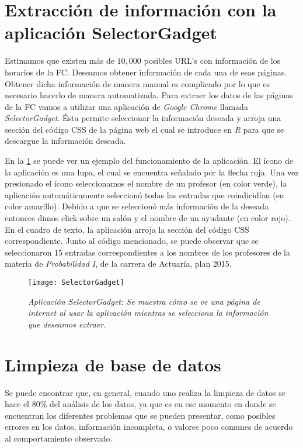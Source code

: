 \section{Extracción de información con la aplicación SelectorGadget}

Estimamos que existen más de $10,000$ posibles URL's con información de los horarios de la FC. Deseamos obtener información de cada una de esas páginas. Obtener dicha información de manera manual es complicado por lo que es necesario hacerlo de manera automatizada. Para extraer los datos de las páginas de la FC vamos a utilizar una aplicación de \textit{Google Chrome} llamada \textit{SelectorGadget}. Ésta permite seleccionar la información deseada y arroja una sección del código CSS de la página web el cual se introduce en \textit{R} para que se descargue la información deseada.

En la \figurename{\ref{appSelectorGadget}} se puede ver un ejemplo del funcionamiento de la aplicación. El ícono de la aplicación es una lupa, el cual se encuentra señalado por la flecha roja. Una vez presionado el ícono seleccionamos el nombre de un profesor (en color verde), la aplicación automáticamente seleccionó todas las entradas que coindicidían (en color amarillo). Debido a que se seleccionó más información de la deseada entonces dimos click sobre un salón y el nombre de un ayudante (en color rojo). En el cuadro de texto, la aplicación arroja la sección del código CSS correspondiente. Junto al código mencionado, se puede observar que se seleccionaron 15 entradas correspondientes a los nombres de los profesores de la materia de \textit{Probabilidad I}, de la carrera de Actuaría, plan 2015.

\begin{figure}[H]
\centering
\texttt{[image: SelectorGadget]} %
\caption[\textit{Aplicación SelectorGadget}]{\textit{Aplicación SelectorGadget: Se muestra cómo se ve una página de internet al usar la aplicación mientras se selecciona la información que deseamos extraer.}}\label{appSelectorGadget}
\end{figure}


\section{Limpieza de base de datos}

Se puede encontrar que, en general, cuando uno realiza la limpieza de datos se hace el 80\% del análisis de los datos, ya que es en ese momento en donde se encuentran los diferentes problemas que se pueden presentar, como posibles errores en los datos, información incompleta, o valores poco comunes de acuerdo al comportamiento observado.

